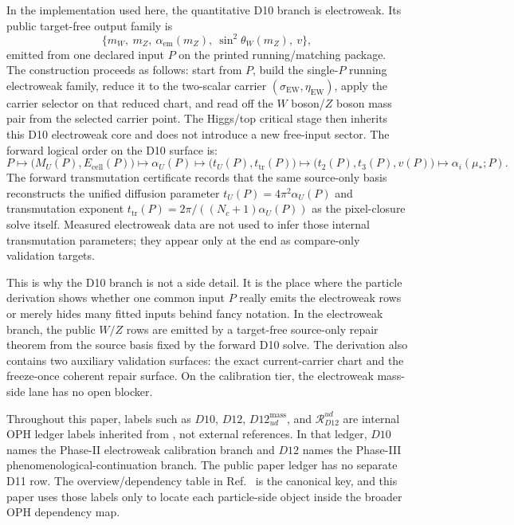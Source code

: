 \documentclass[11pt]{article}
\begin{document}
In the implementation used here, the quantitative D10 branch is electroweak. Its public
target-free output family is
\[
\{m_W,\ m_Z,\ \alpha_{\mathrm{em}}(m_Z),\ \sin^2\theta_W(m_Z),\ v\},
\]
emitted from one declared input \(P\) on the printed running/matching package. The construction
proceeds as follows: start from \(P\), build the single-\(P\) running
electroweak family, reduce it to the two-scalar carrier \((\sigma_{\mathrm{EW}},
\eta_{\mathrm{EW}})\), apply the carrier selector on that reduced chart, and read off the
\(W\) boson/\(Z\) boson mass pair from the selected carrier point. The Higgs/top critical stage
then inherits this D10 electroweak core and does not introduce a new
free-input sector.
The forward logical order on the D10 surface is:
\[
P
\longmapsto
\bigl(M_U(P),E_{\mathrm{cell}}(P)\bigr)
\longmapsto
\alpha_U(P)
\longmapsto
\bigl(t_U(P),t_{\mathrm{tr}}(P)\bigr)
\longmapsto
\bigl(t_2(P),t_3(P),v(P)\bigr)
\longmapsto
\alpha_i(\mu_\ast;P).
\]
The forward transmutation certificate records that the same source-only basis reconstructs the unified diffusion parameter \(t_U(P)=4\pi^2\alpha_U(P)\) and transmutation exponent \(t_{\mathrm{tr}}(P)=2\pi/((N_c+1)\alpha_U(P))\) as the pixel-closure solve itself. Measured electroweak data are not used to infer those internal transmutation parameters; they appear only at the end as compare-only validation targets.

This is why the D10 branch is not a side detail. It is the place where the particle derivation
shows whether one common input \(P\) really emits the electroweak rows or merely hides many fitted
inputs behind fancy notation. In the electroweak branch, the public \(W/Z\) rows are emitted by a
target-free source-only repair theorem from the source basis fixed by the forward D10 solve. The
derivation also contains two
auxiliary validation surfaces: the exact current-carrier chart and the freeze-once coherent repair
surface. On the calibration tier, the electroweak mass-side lane has no open blocker.

Throughout this paper, labels such as \(D10\), \(D12\), \(D12_{ud}^{\mathrm{mass}}\), and
\(\mathcal R_{D12}^{ud}\) are internal OPH ledger labels inherited from
\cite{ophcompact}, not external references. In that ledger, \(D10\) names the Phase-II
electroweak calibration branch and \(D12\) names the Phase-III phenomenological-continuation
branch. The public paper ledger has no separate D11 row. The overview/dependency table in
Ref.~\cite{ophcompact} is the canonical key, and this paper uses those labels only to locate
each particle-side object inside the broader OPH dependency map.
\end{document}
